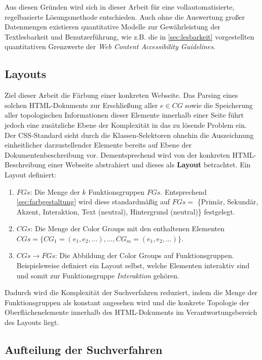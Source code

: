 Aus diesen Gründen wird sich in dieser Arbeit für eine vollautomatisierte, regelbasierte Lösungsmethode entschieden. Auch ohne die Auswertung großer Datenmengen existieren quantitative Modelle zur Gewährleistung der Textlesbarkeit und Benutzerführung, wie z.B. die in \ref{sec:lesbarkeit} vorgestellten quantitativen Grenzwerte der \emph{Web Content Accessibility Guidelines}.

\subsection{Layouts}
\label{sec:layouts}

Ziel dieser Arbeit die Färbung einer konkreten Webseite. Das Parsing eines solchen HTML-Dokuments zur Erschließung aller $e \in CG$ sowie die Speicherung aller topologischen Informationen dieser Elemente innerhalb einer Seite führt jedoch eine zusätzliche Ebene der Komplexität in das zu lösende Problem ein. Der CSS-Standard sieht durch die Klassen-Selektoren \citep{css3-selectors} ohnehin die Auszeichnung einheitlicher darzustellender Elemente bereits auf Ebene der Dokumentenbeschreibung vor. Dementsprechend wird von der konkreten HTML-Beschreibung einer Webseite abstrahiert und dieses als \textbf{Layout} betrachtet. Ein Layout definiert:

\begin{enumerate}
	\item $FGs$: Die Menge der $k$ Funktionsgruppen $FGs$. Entsprechend \autoref{sec:farbgestaltung} wird diese standardmäßig auf $FGs = $ \{Primär, Sekundär, Akzent, Interaktion, Text (neutral), Hintergrund (neutral)\} festgelegt.
	\item $CGs$: Die Menge der Color Groups mit den enthaltenen Elementen $CGs = \{CG_1 = (e_1, e_2, ...), ..., CG_m = (e_1, e_2, ...)\}$.
 	\item $CGs \to FGs$: Die Abbildung der Color Groups auf Funktionsgruppen. Beispielsweise definiert ein Layout selbst, welche Elementen interaktiv sind und somit zur Funktionsgruppe \emph{Interaktion} gehören.
\end{enumerate}

Dadurch wird die Komplexität der Suchverfahren reduziert, indem die Menge der Funktionsgruppen als konstant angesehen wird und die konkrete Topologie der Oberflächenelemente innerhalb des HTML-Dokuments im Verantwortungsbereich des Layouts liegt.

\subsection{Aufteilung der Suchverfahren}
\label{sec:aufteilung}

